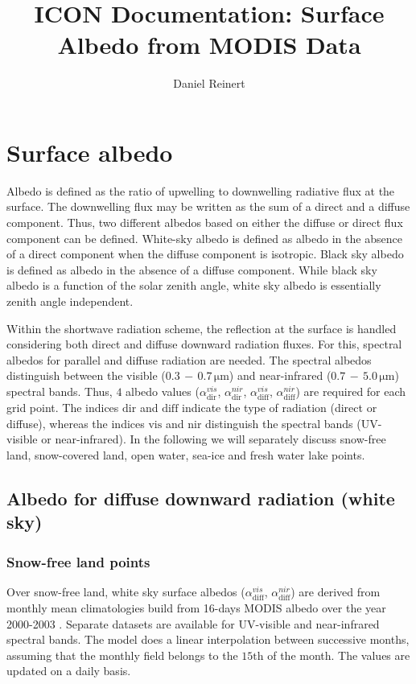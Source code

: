 \documentclass[a4paper,11pt]{article}
\author{Daniel Reinert}
\title{ICON Documentation: Surface Albedo from MODIS Data}
\begin{document}
  \maketitle



\section{Surface albedo}
Albedo is defined as the ratio of upwelling to downwelling radiative flux at the surface. The downwelling flux may be written as the sum of a direct and a diffuse component. Thus, two 
different albedos based on either the diffuse or direct flux component can be defined. White-sky albedo is defined as albedo in the absence of a direct component when the diffuse 
component is isotropic. Black sky albedo is defined as albedo in the absence of a diffuse component. While black sky albedo is a function of the solar zenith angle, white sky albedo 
is essentially zenith angle independent.

Within the shortwave radiation scheme, the reflection at the surface is handled considering both direct and diffuse downward radiation fluxes. For this, spectral albedos for parallel and 
diffuse radiation are needed. The spectral albedos distinguish between the visible ($0.3\,-\,0.7\,\mathrm{\mu m}$) and near-infrared ($0.7\,-\,5.0\,\mathrm{\mu m}$) spectral bands. Thus, 
$4$ albedo values ($\alpha_{\mathrm{dir}}^{vis}$, $\alpha_{\mathrm{dir}}^{nir}$, $\alpha_{\mathrm{diff}}^{vis}$, $\alpha_{\mathrm{diff}}^{nir}$) are required for each grid point. The 
indices $\mathrm{dir}$ and $\mathrm{diff}$ indicate the type of radiation (direct or diffuse), whereas the indices $\mathrm{vis}$ and $\mathrm{nir}$ distinguish the spectral bands 
(UV-visible or near-infrared). In the following we will separately discuss snow-free land, snow-covered land, open water, sea-ice and fresh water lake points.


\subsection{Albedo for diffuse downward radiation (white sky)}

\subsubsection{Snow-free land points}
Over snow-free land, white sky surface albedos ($\alpha_{\mathrm{diff}}^{vis}$, $\alpha_{\mathrm{diff}}^{nir}$) are derived from monthly mean climatologies build from 16-days MODIS 
albedo over the year 2000-2003 \citep{Schaaf:2002}. Separate datasets are available for UV-visible and near-infrared spectral bands. The model does a linear interpolation between successive 
months, assuming that the monthly field belongs to the $15\mathrm{th}$ of the month. The values are updated on a daily basis.
\end{document}
